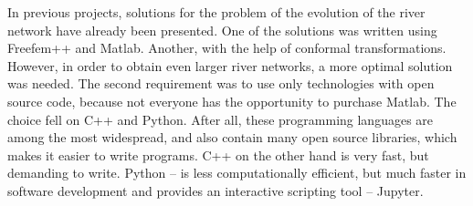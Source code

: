 \documentclass[]{pracamgr}
\begin{document}
    In previous projects, solutions for the problem of the evolution of the river network have already been presented. One of the solutions was written using Freefem++ and Matlab. Another, with the help of conformal transformations. However, in order to obtain even larger river networks, a more optimal solution was needed. The second requirement was to use only technologies with open source code, because not everyone has the opportunity to purchase Matlab. The choice fell on C++\cite{Stroustrup1997} and Python. After all, these programming languages are among the most widespread, and also contain many open source libraries, which makes it easier to write programs. C++ on the other hand is very fast, but demanding to write. Python\cite{python3} -- is less computationally efficient, but much faster in software development and provides an interactive scripting tool -- Jupyter.
\end{document}
